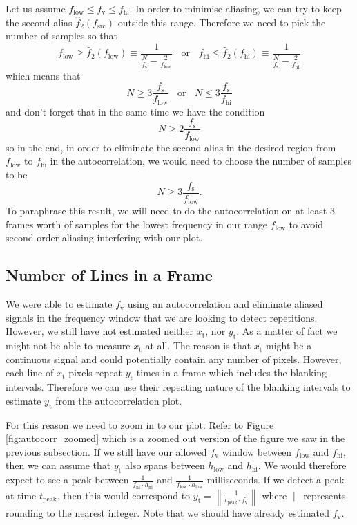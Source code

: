 \documentclass[a4paper,12pt,twoside,openright]{report}
\begin{document}
Let us assume $f_\text{low} \leq f_\text{v} \leq f_\text{hi}$. In order to minimise aliasing, we can try to keep the second alias $\hat{f}_{2}(f_\text{src})$ outside this range. Therefore we need to pick the number of samples so that
$$f_\text{low} \geq \hat{f}_{2}(f_\text{low}) \equiv \frac{1}{\frac{N}{f_\text{s}}-\frac{2}{f_\text{low}}}  \,\,\,\,\ \text{or} \,\,\,\,\ f_\text{hi} \leq \hat{f}_{2}(f_\text{hi}) \equiv \frac{1}{\frac{N}{f_\text{s}}-\frac{2}{f_\text{hi}}}  $$
which means that
$$ N \geq 3 \frac{f_\text{s}}{f_\text{low}} \,\,\,\,\ \text{or} \,\,\,\,\ N \leq 3 \frac{f_\text{s}}{f_\text{hi}} $$
and don't forget that in the same time we have the condition
$$N \geq 2 \frac{f_\text{s}}{f_\text{low}}$$
so in the end, in order to eliminate the second alias in the desired region from $f_\text{low}$ to $f_\text{hi}$ in the autocorrelation, we would need to choose the number of samples to be
\begin{equation}
\label{eq:autocorraliasingcondition}
N \geq 3 \frac{f_\text{s}}{f_\text{low}} .
\end{equation}
To paraphrase this result, we will need to do the autocorrelation on at least 3 frames worth of samples for the lowest frequency in our range $f_\text{low}$ to avoid second order aliasing interfering with our plot.

\subsection{Number of Lines in a Frame}

We were able to estimate $f_\text{v}$ using an autocorrelation and eliminate aliased signals in the frequency window that we are looking to detect repetitions. However, we still have not estimated neither $x_\text{t}$, nor $y_\text{t}$. As a matter of fact we might not be able to measure $x_\text{t}$ at all. The reason is that $x_\text{t}$ might be a continuous signal and could potentially contain any number of pixels. However, each line of $x_\text{t}$ pixels repeat $y_\text{t}$ times in a frame which includes the blanking intervals. Therefore we can use their repeating nature of the blanking intervals to estimate $y_\text{t}$ from the autocorrelation plot.

For this reason we need to zoom in to our plot. Refer to Figure \ref{fig:autocorr_zoomed} which is a zoomed out version of the figure we saw in the previous subsection. If we still have our allowed $f_\text{v}$ window between $f_\text{low}$ and $f_\text{hi}$, then we can assume that $y_\text{t}$ also spans between $h_\text{low}$ and $h_\text{hi}$. We would therefore expect to see a peak between $\frac{1}{f_\text{hi} \cdot h_\text{hi}}$ and $\frac{1}{f_\text{low} \cdot h_\text{low}}$ milliseconds. If we detect a peak at time $t_\text{peak}$, then this would correspond to $y_\text{t} = \left\| \frac{1}{t_\text{peak} \cdot f_\text{v}} \right\|$ where $\|$ represents rounding to the nearest integer. Note that we should have already estimated $f_\text{v}$.
\end{document}
